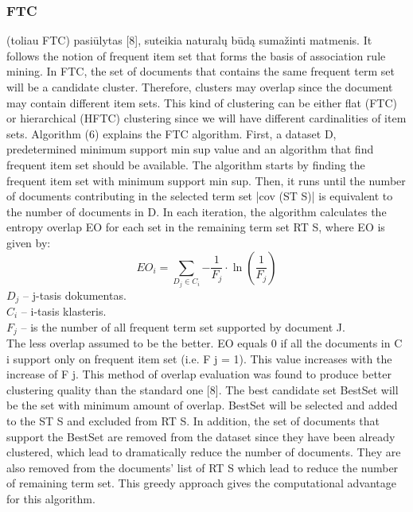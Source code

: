 \documentclass{VUMIFInfKursinis}
\begin{document}
		\subsubsection{FTC}
			 (toliau FTC) pasiūlytas [8], suteikia naturalų būdą sumažinti matmenis.
			It follows the notion of frequent item set that forms the basis of association rule mining. In FTC, the set of documents that contains the same frequent term set will be a candidate cluster. Therefore, clusters may overlap since the document may contain different item sets. This kind of clustering can be either flat (FTC) or hierarchical (HFTC) clustering since we will have different cardinalities of item sets.
			Algorithm (6) explains the FTC algorithm. First, a dataset D, predetermined minimum support min sup value and an algorithm that find frequent item set should be available. The algorithm starts by finding the frequent item set with minimum support min sup. Then, it runs until the number of documents contributing in the selected term set |cov (ST S)| is equivalent to the number of documents in D. In each iteration, the algorithm calculates the entropy overlap EO for each set in the remaining term set RT S, where EO is given by:
			\begin{equation}
				EO_i=\sum_{D_j \in C_i}{-\frac{1}{F_j}\cdot\ln(\frac{1}{F_j})}
			\end{equation} 
			$D_j$ – j-tasis dokumentas.\\
			$C_i$ – i-tasis klasteris.\\
			$F_j$ – is the number of all frequent term set supported by document J.\\
			The less overlap assumed to be the better. EO equals 0 if all the documents in C i support only on frequent item set (i.e. F j = 1). This value increases with the increase of F j. This method of overlap evaluation was found to produce better clustering quality than the standard one [8]. The best candidate set BestSet will be the set with minimum amount of overlap. BestSet will be selected and added to the ST S and excluded from RT S. In addition, the set of documents that support the BestSet are removed from the dataset since they have been already clustered, which lead to dramatically reduce the number of documents. They are also removed from the documents’ list of RT S which lead to reduce the number of remaining term set. This greedy approach gives the computational advantage for this algorithm.
\end{document}

